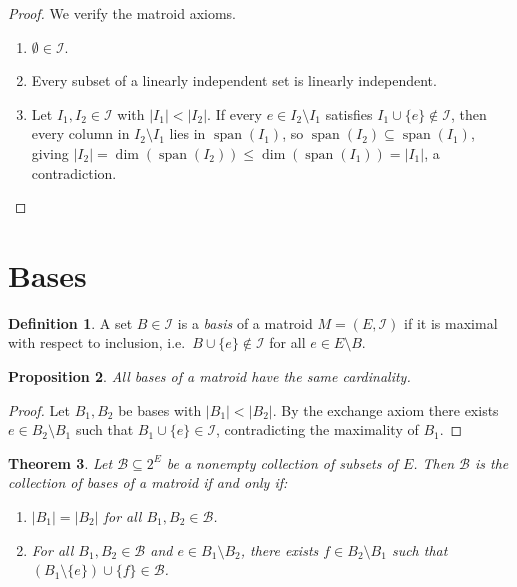 \documentclass[11pt]{article}
\theoremstyle{plain}
\newtheorem{theorem}{Theorem}[section]
\newtheorem{proposition}[theorem]{Proposition}
\theoremstyle{definition}
\newtheorem{definition}[theorem]{Definition}
\begin{document}
\begin{proof}
We verify the matroid axioms.
\begin{enumerate}[label=(\roman*), itemsep=0.4ex]
  \item $\emptyset \in \mathcal{I}$.
  \item Every subset of a linearly independent set is linearly independent.
  \item Let $I_1, I_2 \in \mathcal{I}$ with $|I_1| < |I_2|$.
        If every $e \in I_2 \setminus I_1$ satisfies
        $I_1 \cup \{e\} \notin \mathcal{I}$, then every column in
        $I_2 \setminus I_1$ lies in $\operatorname{span}(I_1)$,
        so $\operatorname{span}(I_2) \subseteq \operatorname{span}(I_1)$,
        giving $|I_2| = \dim(\operatorname{span}(I_2))
        \le \dim(\operatorname{span}(I_1)) = |I_1|$, a contradiction. \qedhere
\end{enumerate}
\end{proof}
 
\section{Bases}
 
\begin{definition}
A set $B \in \mathcal{I}$ is a \emph{basis} of a matroid $M = (E, \mathcal{I})$
if it is maximal with respect to inclusion, i.e.\
$B \cup \{e\} \notin \mathcal{I}$ for all $e \in E \setminus B$.
\end{definition}
 
\begin{proposition}
All bases of a matroid have the same cardinality.
\end{proposition}
 
\begin{proof}
Let $B_1, B_2$ be bases with $|B_1| < |B_2|$.
By the exchange axiom there exists $e \in B_2 \setminus B_1$ such that
$B_1 \cup \{e\} \in \mathcal{I}$, contradicting the maximality of $B_1$.
\end{proof}
 
\begin{theorem}
Let $\mathcal{B} \subseteq 2^{E}$ be a nonempty collection of subsets of $E$.
Then $\mathcal{B}$ is the collection of bases of a matroid if and only if:
\begin{enumerate}[label=(\roman*), itemsep=0.4ex]
  \item $|B_1| = |B_2|$ for all $B_1, B_2 \in \mathcal{B}$.
  \item For all $B_1, B_2 \in \mathcal{B}$ and $e \in B_1 \setminus B_2$,
        there exists $f \in B_2 \setminus B_1$ such that
        $(B_1 \setminus \{e\}) \cup \{f\} \in \mathcal{B}$.
\end{enumerate}
\end{theorem}
 
\end{document}
